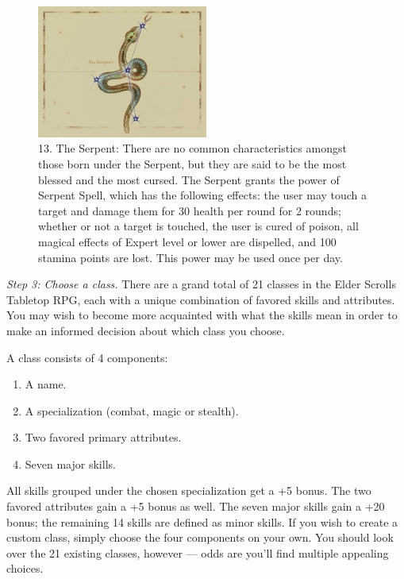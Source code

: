 \documentclass[12pt]{article}
\begin{document}
\begin{figure}[H]
\includegraphics[width=0.5\textwidth]{Serpent.png}
\centering
\caption*{13. The Serpent: There are no common characteristics amongst those born under the Serpent, but they are said to be the most blessed and the most cursed. The Serpent grants the power of Serpent Spell, which has the following effects: the user may touch a target and damage them for 30 health per round for 2 rounds; whether or not a target is touched, the user is cured of poison, all magical effects of Expert level or lower are dispelled, and 100 stamina points are lost. This power may be used once per day.}
\end{figure}

\newpage
\textit{Step 3: Choose a class.}
There are a grand total of 21 classes in the Elder Scrolls Tabletop RPG, each with a unique combination of favored skills and attributes. You may wish to become more acquainted with what the skills mean in order to make an informed decision about which class you choose.

A class consists of 4 components:
\begin{enumerate}
	\item A name.
	\item A specialization (combat, magic or stealth).
	\item Two favored primary attributes.
	\item Seven major skills.
\end{enumerate}

All skills grouped under the chosen specialization get a +5 bonus. The two favored attributes gain a +5 bonus as well. The seven major skills gain a +20 bonus; the remaining 14 skills are defined as minor skills. If you wish to create a custom class, simply choose the four components on your own. You should look over the 21 existing classes, however --- odds are you'll find multiple appealing choices.\\
\end{document}
